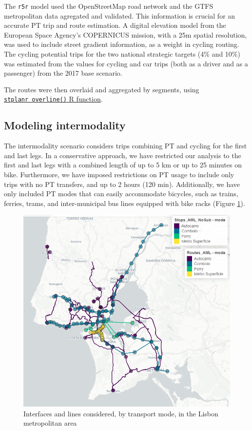 \documentclass[runningheads]{llncs}
\begin{document}
The \texttt{r5r} model used the OpenStreetMap road network and the GTFS
metropolitan data agregated and validated. This information is crucial
for an accurate PT trip and route estimation. A digital elevation model
from the European Space Agency's COPERNICUS mission, with a 25m spatial
resolution, was used to include street gradient information, as a weight
in cycling routing. The cycling potential trips for the two national
strategic targets (4\% and 10\%) was estimated from the values for
cycling and car trips (both as a driver and as a passenger) from the
2017 base scenario.

The routes were then overlaid and aggregated by segments, using
\href{https://docs.ropensci.org/stplanr/reference/overline.html}{\texttt{stplanr\ overline()}
R function}.

\hypertarget{modeling-intermodality}{%
\subsection{Modeling intermodality}\label{modeling-intermodality}}

The intermodality scenario considers trips combining PT and cycling for
the first and last legs. In a conservative approach, we have restricted
our analysis to the first and last legs with a combined length of up to
5 km or up to 25 minutes on bike. Furthermore, we have imposed
restrictions on PT usage to include only trips with no PT transfers, and
up to 2 hours (120 min). Additionally, we have only included PT modes
that can easily accommodate bicycles, such as trains, ferries, trams,
and inter-municipal bus lines equipped with bike racks (Figure
\ref{fig:map1}).

\begin{figure}

{\centering \includegraphics[width=0.6\linewidth,]{img/map1} 

}

\caption{Interfaces and lines considered, by transport mode, in the Lisbon metropolitan area}\label{fig:map1}
\end{figure}
\end{document}
